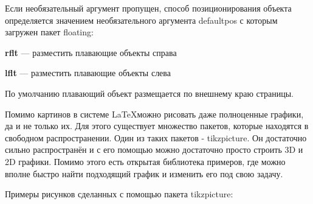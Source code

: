 \documentclass[a4paper,14pt,russian]{extreport}
\newcommand{\toCenter}[1]{\begin{center}#1\par\end{center}}
\begin{document}
Если необязательный аргумент пропущен, способ позиционирования объекта определяется значением необязательного аргумента defaultpos с которым загружен пакет floating:

\textbf{rflt} --- разместить плавающие объекты справа

\textbf{lflt} --- разместить плавающие объекты слева

По умолчанию плавающий объект размещается по внешнему краю страницы.

\newpage
Помимо картинов в системе \LaTeX можно рисовать даже полноценные графики, да и не только их. Для этого существует множество пакетов, которые находятся в свободном распространении. Один из таких пакетов - tikzpicture. Он достаточно сильно распространён и с его помощью можно достаточно просто строить 3D и 2D графики. Помимо этого есть открытая библиотека примеров, где можно вполне быстро найти подходящий график и изменить его под свою задачу.

\toCenter{Примеры рисунков сделанных с помощью пакета tikzpicture:}




\pgfplotsset{width=7cm, compat=1.10}

\end{document}
